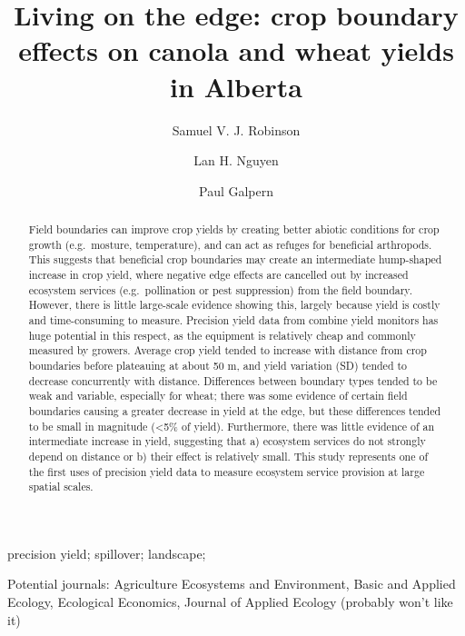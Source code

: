 \documentclass[]{elsarticle} %
\begin{document}
\begin{frontmatter}

  \title{Living on the edge: crop boundary effects on canola and wheat yields in Alberta}
    \author[University of Calgary]{Samuel V. J. Robinson}
    \author[University of Calgary]{Lan H. Nguyen}
    \author[University of Calgary]{Paul Galpern}
      \address[University of Calgary]{2500 University Drive NW, Calgary, AB}
  
  \begin{abstract}
  Field boundaries can improve crop yields by creating better abiotic conditions for crop growth (e.g.~mosture, temperature), and can act as refuges for beneficial arthropods. This suggests that beneficial crop boundaries may create an intermediate hump-shaped increase in crop yield, where negative edge effects are cancelled out by increased ecosystem services (e.g.~pollination or pest suppression) from the field boundary. However, there is little large-scale evidence showing this, largely because yield is costly and time-consuming to measure. Precision yield data from combine yield monitors has huge potential in this respect, as the equipment is relatively cheap and commonly measured by growers. Average crop yield tended to increase with distance from crop boundaries before plateauing at about 50 m, and yield variation (SD) tended to decrease concurrently with distance. Differences between boundary types tended to be weak and variable, especially for wheat; there was some evidence of certain field boundaries causing a greater decrease in yield at the edge, but these differences tended to be small in magnitude (\textless5\% of yield). Furthermore, there was little evidence of an intermediate increase in yield, suggesting that a) ecosystem services do not strongly depend on distance or b) their effect is relatively small. This study represents one of the first uses of precision yield data to measure ecosystem service provision at large spatial scales.
  \end{abstract}
   \begin{keyword} precision yield; spillover; landscape;\end{keyword}
 \end{frontmatter}

Potential journals: Agriculture Ecosystems and Environment, Basic and Applied Ecology, Ecological Economics, Journal of Applied Ecology (probably won't like it)
\end{document}
